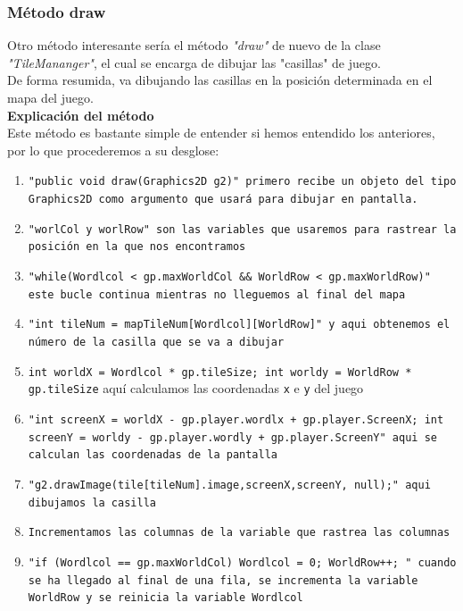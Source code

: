 \documentclass[a4paper]{article}
\begin{document}
\subsubsection{Método draw}
Otro método interesante sería el método \textit{"draw"} de nuevo de la clase \textit{"TileMananger"}, el cual se encarga de dibujar las "casillas" de juego.\\
De forma resumida, va dibujando las casillas en la posición determinada en el mapa del juego.\\
\textbf{Explicación del método}\\
Este método es bastante simple de entender si hemos entendido los anteriores, por lo que procederemos a su desglose:
\begin{enumerate}
    \item \texttt{"public void draw(Graphics2D g2)" primero recibe un objeto del tipo Graphics2D como argumento que usará para dibujar en pantalla.}
    \item \texttt{"worlCol y worlRow" son las variables que usaremos para rastrear la posición en la que nos encontramos}
    \item \texttt{"while(Wordlcol < gp.maxWorldCol \&\& WorldRow < gp.maxWorldRow)" este bucle continua mientras no lleguemos al final del mapa}
    \item \texttt{"int tileNum = mapTileNum[Wordlcol][WorldRow]" y aqui obtenemos el número de la casilla que se va a dibujar}
    \item \texttt{int worldX = Wordlcol * gp.tileSize; int worldy = WorldRow * gp.tileSize} aquí calculamos las coordenadas \texttt{x} e \texttt{y} del juego
    \item \texttt{"int screenX = worldX - gp.player.wordlx + gp.player.ScreenX; int screenY = worldy - gp.player.wordly + gp.player.ScreenY" aqui se calculan las coordenadas de la pantalla}
    \item \texttt{"g2.drawImage(tile[tileNum].image,screenX,screenY, null);" aqui dibujamos la casilla}
    \item \texttt{Incrementamos las columnas de la variable que rastrea las columnas}
    \item \texttt{"if (Wordlcol == gp.maxWorldCol){ Wordlcol = 0; WorldRow++; }" cuando se ha llegado al final de una fila, se incrementa la variable WorldRow y se reinicia la variable Wordlcol}
\end{enumerate}
\end{document}
